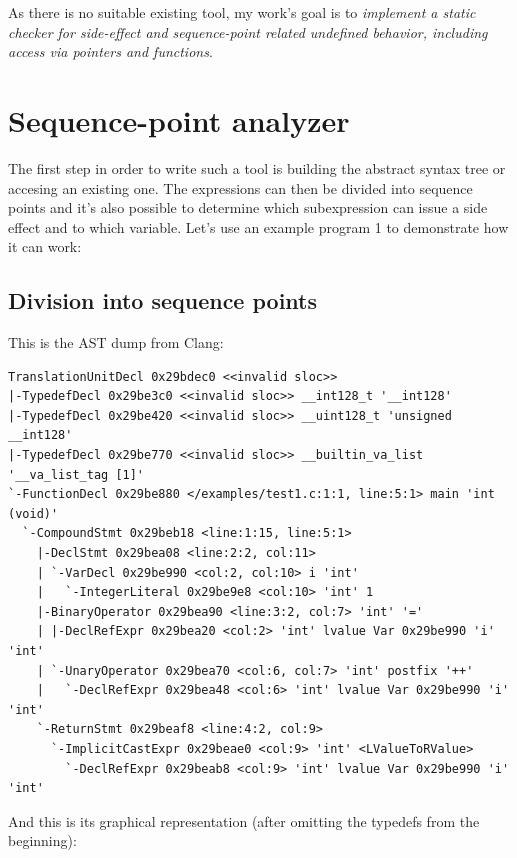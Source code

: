 As there is no suitable existing tool, my work's goal is to \emph{implement a static checker for side-effect and sequence-point related undefined behavior, including access via pointers and functions}.

\chapter{Sequence-point analyzer}
The first step in order to write such a tool is building the abstract syntax tree or accesing an existing one. The expressions can then be divided into sequence points and it's also possible to determine which subexpression can issue a side effect and to which variable. Let's use an example program 1 to demonstrate how it can work:
\section{Division into sequence points}
This is the AST dump from Clang:

\small{
\begin{lstlisting}
TranslationUnitDecl 0x29bdec0 <<invalid sloc>>
|-TypedefDecl 0x29be3c0 <<invalid sloc>> __int128_t '__int128'
|-TypedefDecl 0x29be420 <<invalid sloc>> __uint128_t 'unsigned __int128'
|-TypedefDecl 0x29be770 <<invalid sloc>> __builtin_va_list '__va_list_tag [1]'
`-FunctionDecl 0x29be880 </examples/test1.c:1:1, line:5:1> main 'int (void)'
  `-CompoundStmt 0x29beb18 <line:1:15, line:5:1>
    |-DeclStmt 0x29bea08 <line:2:2, col:11>
    | `-VarDecl 0x29be990 <col:2, col:10> i 'int'
    |   `-IntegerLiteral 0x29be9e8 <col:10> 'int' 1
    |-BinaryOperator 0x29bea90 <line:3:2, col:7> 'int' '='
    | |-DeclRefExpr 0x29bea20 <col:2> 'int' lvalue Var 0x29be990 'i' 'int'
    | `-UnaryOperator 0x29bea70 <col:6, col:7> 'int' postfix '++'
    |   `-DeclRefExpr 0x29bea48 <col:6> 'int' lvalue Var 0x29be990 'i' 'int'
    `-ReturnStmt 0x29beaf8 <line:4:2, col:9>
      `-ImplicitCastExpr 0x29beae0 <col:9> 'int' <LValueToRValue>
        `-DeclRefExpr 0x29beab8 <col:9> 'int' lvalue Var 0x29be990 'i' 'int'
\end{lstlisting}}

And this is its graphical representation (after omitting the typedefs from the beginning):

